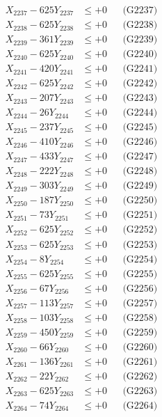 \documentclass[a4paper,10pt]{article}
\begin{document}
{\begin{align}
X_{2237} - 625Y_{2237} &\leq +0 && \text{(G2237)} \\
X_{2238} - 625Y_{2238} &\leq +0 && \text{(G2238)} \\
X_{2239} - 361Y_{2239} &\leq +0 && \text{(G2239)} \\
X_{2240} - 625Y_{2240} &\leq +0 && \text{(G2240)} \\
\allowbreak
X_{2241} - 420Y_{2241} &\leq +0 && \text{(G2241)} \\
X_{2242} - 625Y_{2242} &\leq +0 && \text{(G2242)} \\
X_{2243} - 207Y_{2243} &\leq +0 && \text{(G2243)} \\
X_{2244} - 26Y_{2244} &\leq +0 && \text{(G2244)} \\
X_{2245} - 237Y_{2245} &\leq +0 && \text{(G2245)} \\
X_{2246} - 410Y_{2246} &\leq +0 && \text{(G2246)} \\
X_{2247} - 433Y_{2247} &\leq +0 && \text{(G2247)} \\
X_{2248} - 222Y_{2248} &\leq +0 && \text{(G2248)} \\
X_{2249} - 303Y_{2249} &\leq +0 && \text{(G2249)} \\
X_{2250} - 187Y_{2250} &\leq +0 && \text{(G2250)} \\
\allowbreak
X_{2251} - 73Y_{2251} &\leq +0 && \text{(G2251)} \\
X_{2252} - 625Y_{2252} &\leq +0 && \text{(G2252)} \\
X_{2253} - 625Y_{2253} &\leq +0 && \text{(G2253)} \\
X_{2254} - 8Y_{2254} &\leq +0 && \text{(G2254)} \\
X_{2255} - 625Y_{2255} &\leq +0 && \text{(G2255)} \\
X_{2256} - 67Y_{2256} &\leq +0 && \text{(G2256)} \\
X_{2257} - 113Y_{2257} &\leq +0 && \text{(G2257)} \\
X_{2258} - 103Y_{2258} &\leq +0 && \text{(G2258)} \\
X_{2259} - 450Y_{2259} &\leq +0 && \text{(G2259)} \\
X_{2260} - 66Y_{2260} &\leq +0 && \text{(G2260)} \\
\allowbreak
X_{2261} - 136Y_{2261} &\leq +0 && \text{(G2261)} \\
X_{2262} - 22Y_{2262} &\leq +0 && \text{(G2262)} \\
X_{2263} - 625Y_{2263} &\leq +0 && \text{(G2263)} \\
X_{2264} - 74Y_{2264} &\leq +0 && \text{(G2264)} \\

\end{align}}
\end{document}
